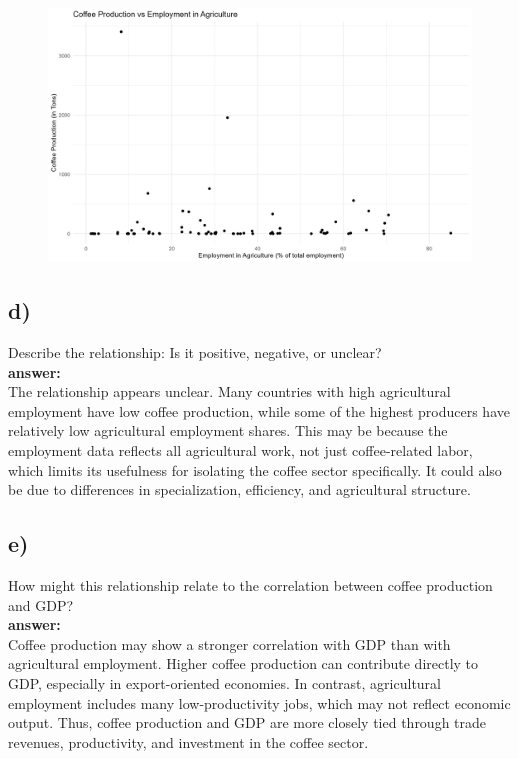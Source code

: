 \documentclass[12pt]{article}
\begin{document}
\begin{figure}[h]
    \centering
    \includegraphics[width=1\linewidth]{Figures/HW_2.1_c.png}
\end{figure}

\subsection*{d)} Describe the relationship: Is it positive, negative, or unclear?\\

\textbf{answer:}\\

The relationship appears unclear. Many countries with high agricultural employment have low coffee production, while some of the highest producers have relatively low agricultural employment shares. This may be because the employment data reflects all agricultural work, not just coffee-related labor, which limits its usefulness for isolating the coffee sector specifically. It could also be due to differences in specialization, efficiency, and agricultural structure.

\subsection*{e)} How might this relationship relate to the correlation between coffee production and GDP?\\

\textbf{answer:}\\

Coffee production may show a stronger correlation with GDP than with agricultural employment. Higher coffee production can contribute directly to GDP, especially in export-oriented economies. In contrast, agricultural employment includes many low-productivity jobs, which may not reflect economic output. Thus, coffee production and GDP are more closely tied through trade revenues, productivity, and investment in the coffee sector.
\end{document}
